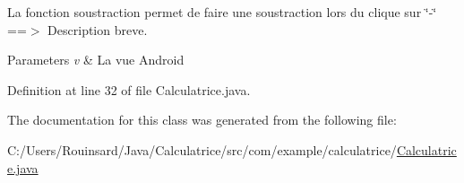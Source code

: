 La fonction soustraction permet de faire une soustraction lors du clique sur \char`\"{}-\/\char`\"{} ==$>$ Description breve. 


\begin{DoxyParams}{Parameters}
{\em v} & La vue Android \\
\hline
\end{DoxyParams}


Definition at line 32 of file Calculatrice.\-java.



The documentation for this class was generated from the following file\-:\begin{DoxyCompactItemize}
\item 
C\-:/\-Users/\-Rouinsard/\-Java/\-Calculatrice/src/com/example/calculatrice/\hyperlink{_calculatrice_8java}{Calculatrice.\-java}\end{DoxyCompactItemize}
